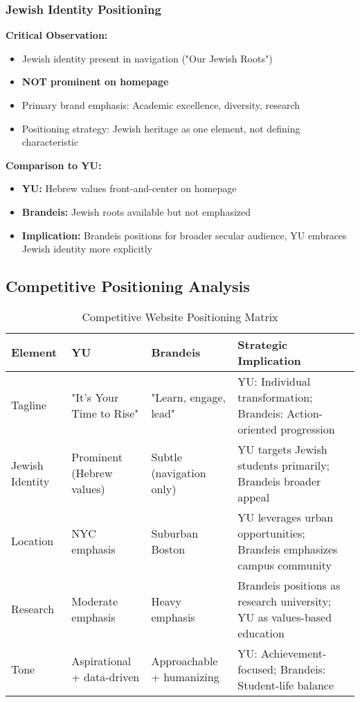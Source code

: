 \documentclass[12pt,letterpaper]{article}
\begin{document}
\subsubsection{Jewish Identity Positioning}

\textbf{Critical Observation:}
\begin{itemize}[leftmargin=*]
    \item Jewish identity present in navigation ("Our Jewish Roots")
    \item \textbf{NOT prominent on homepage}
    \item Primary brand emphasis: Academic excellence, diversity, research
    \item Positioning strategy: Jewish heritage as one element, not defining characteristic
\end{itemize}

\textbf{Comparison to YU:}
\begin{itemize}[leftmargin=*]
    \item \textbf{YU:} Hebrew values front-and-center on homepage
    \item \textbf{Brandeis:} Jewish roots available but not emphasized
    \item \textbf{Implication:} Brandeis positions for broader secular audience, YU embraces Jewish identity more explicitly
\end{itemize}

\subsection{Competitive Positioning Analysis}

\begin{table}[h]
\centering
\small
\begin{tabular}{@{}p{2.5cm}p{4cm}p{4cm}p{4cm}@{}}
\toprule
\textbf{Element} & \textbf{YU} & \textbf{Brandeis} & \textbf{Strategic Implication} \\
\midrule
Tagline & "It's Your Time to Rise" & "Learn, engage, lead" & YU: Individual transformation; Brandeis: Action-oriented progression \\
\addlinespace
Jewish Identity & Prominent (Hebrew values) & Subtle (navigation only) & YU targets Jewish students primarily; Brandeis broader appeal \\
\addlinespace
Location & NYC emphasis & Suburban Boston & YU leverages urban opportunities; Brandeis emphasizes campus community \\
\addlinespace
Research & Moderate emphasis & Heavy emphasis & Brandeis positions as research university; YU as values-based education \\
\addlinespace
Tone & Aspirational + data-driven & Approachable + humanizing & YU: Achievement-focused; Brandeis: Student-life balance \\
\bottomrule
\end{tabular}
\caption{Competitive Website Positioning Matrix}
\end{table}
\end{document}
